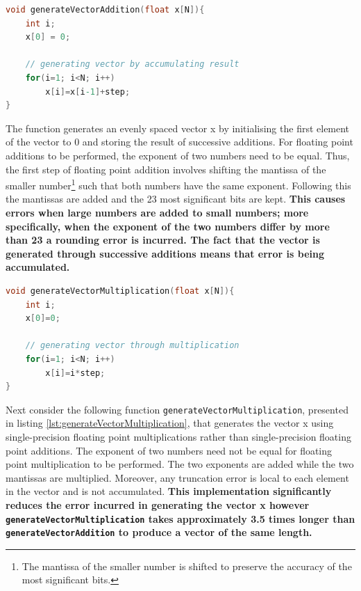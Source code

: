 \documentclass{article}
\begin{document}
\begin{lstlisting}[language=C, frame=single, caption={\tt generateVectorAddition}]
void generateVectorAddition(float x[N]){
	int i;
	x[0] = 0;
	
	// generating vector by accumulating result
	for(i=1; i<N; i++)
		x[i]=x[i-1]+step;
}
\end{lstlisting}


The function generates an evenly spaced vector x by initialising the first element of the vector to 0 and storing the result of successive additions. For floating point additions to be performed, the exponent of two numbers need to be equal. Thus, the first step of floating point addition involves shifting the mantissa of the smaller number\footnote{The mantissa of the smaller number is shifted to preserve the accuracy of the most significant bits.} such that both numbers have the same exponent. Following this the mantissas are added and the 23 most significant bits are kept. \textbf{This causes errors when large numbers are added to small numbers; more specifically, when the exponent of the two numbers differ by more than 23 a rounding error is incurred. The fact that the vector is generated through successive additions means that error is being accumulated.}\\

\begin{lstlisting}[language=C, frame=single, caption={\tt generateVectorMultiplication}, label=lst:generateVectorMultiplication]
void generateVectorMultiplication(float x[N]){
	int i;
	x[0]=0;
	
	// generating vector through multiplication
	for(i=1; i<N; i++)
		x[i]=i*step;
}
\end{lstlisting}

Next consider the following function {\tt generateVectorMultiplication}, presented in listing \ref{lst:generateVectorMultiplication}, that generates the vector x using single-precision floating point multiplications rather than single-precision floating point additions. The exponent of two numbers need not be equal for floating point multiplication to be performed. The two exponents are added while the two mantissas are multiplied. Moreover, any truncation error is local to each element in the vector and is not accumulated. \textbf{This implementation significantly reduces the error incurred in generating the vector x however {\tt generateVectorMultiplication} takes approximately 3.5 times longer than {\tt generateVectorAddition} to produce a vector of the same length.}\\ 
 
\end{document}
